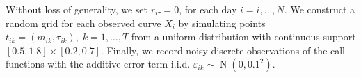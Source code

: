 

Without loss of generality, we set $r_{i\tau}=0$, for each day $i=i,\ldots,N$. %
We construct a random grid for each observed curve $X_i$ by simulating points $t_{ik}=(m_{ik},\tau_{ik}), \; k=1,\dots,T$ from a uniform distribution with continuous support $[0.5,1.8]\times[0.2,0.7]$. %
Finally, we record noisy discrete observations of the call functions with the additive error term i.i.d. $\varepsilon_{ik} \sim \operatorname{N}(0,0.1^2)$.%




